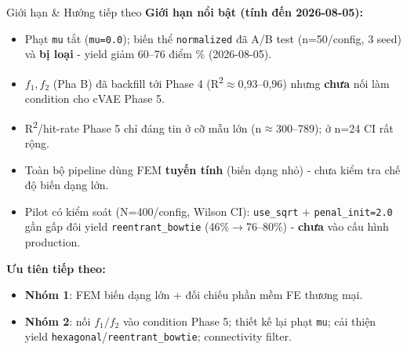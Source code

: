 \documentclass[aspectratio=169,11pt]{beamer}
\begin{document}
\begin{frame}{Giới hạn \& Hướng tiếp theo}
  \small
  \textbf{Giới hạn nổi bật (tính đến 2026-08-05):}
  \begin{itemize}
    \item Phạt \texttt{mu} tắt (\texttt{mu=0.0}); biến thể \texttt{normalized} đã A/B test (n=50/config, 3 seed) và \textbf{bị loại} - yield giảm 60--76 điểm \% (2026-08-05).
    \item $f_1, f_2$ (Pha B) đã backfill tới Phase 4 (R\textsuperscript{2}$\approx$0,93--0,96) nhưng \textbf{chưa} nối làm condition cho cVAE Phase 5.
    \item R\textsuperscript{2}/hit-rate Phase 5 chỉ đáng tin ở cỡ mẫu lớn (n$\approx$300--789); ở n=24 CI rất rộng.
    \item Toàn bộ pipeline dùng FEM \textbf{tuyến tính} (biến dạng nhỏ) - chưa kiểm tra chế độ biến dạng lớn.
    \item Pilot có kiểm soát (N=400/config, Wilson CI): \texttt{use\_sqrt} + \texttt{penal\_init=2.0} gần gấp đôi yield \texttt{reentrant\_bowtie} (46\%$\to$76--80\%) - \textbf{chưa} vào cấu hình production.
  \end{itemize}
  \vspace{2mm}
  \textbf{Ưu tiên tiếp theo:}
  \begin{itemize}
    \item \textbf{Nhóm 1}: FEM biến dạng lớn + đối chiếu phần mềm FE thương mại.
    \item \textbf{Nhóm 2}: nối $f_1/f_2$ vào condition Phase 5; thiết kế lại phạt \texttt{mu}; cải thiện yield \texttt{hexagonal}/\texttt{reentrant\_bowtie}; connectivity filter.
  \end{itemize}
\end{frame}
\end{document}
